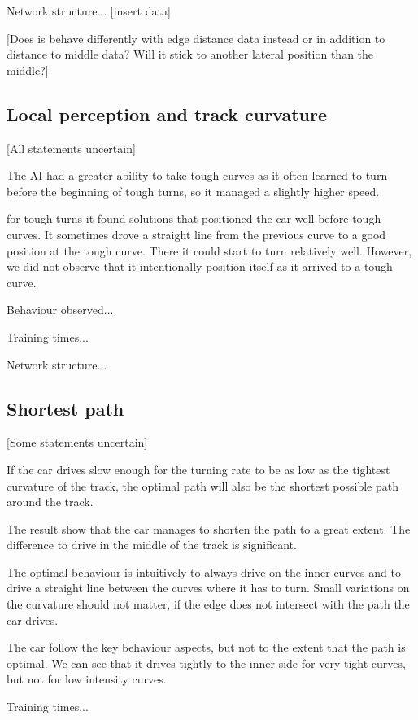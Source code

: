 Network structure...  [insert data]

[Does is behave differently with edge distance data instead or in addition to distance to middle data? Will it stick to another lateral position than the middle?]


\subsection{Local perception and track curvature}

[All statements uncertain]

The AI had a greater ability to take tough curves as it often learned to turn before the beginning of tough turns, so it managed a slightly higher speed.

for tough turns it found solutions that positioned the car well before tough curves. It sometimes drove a straight line from the previous curve to a good position at the tough curve. There it could start to turn relatively well. However, we did not observe that it intentionally position itself as it arrived to a tough curve.

Behaviour observed...

Training times...

Network structure... 


\subsection{Shortest path}

[Some statements uncertain]

If the car drives slow enough for the turning rate to be as low as the tightest curvature of the track, the optimal path will also be the shortest possible path around the track.

The result show that the car manages to shorten the path to a great extent. The difference to drive in the middle of the track is significant.

The optimal behaviour is intuitively to always drive on the inner curves and to drive a straight line between the curves where it has to turn. Small variations on the curvature should not matter, if the edge does not intersect with the path the car drives.

The car follow the key behaviour aspects, but not to the extent that the path is optimal. We can see that it drives tightly to the inner side for very tight curves, but not for low intensity curves.

Training times...

